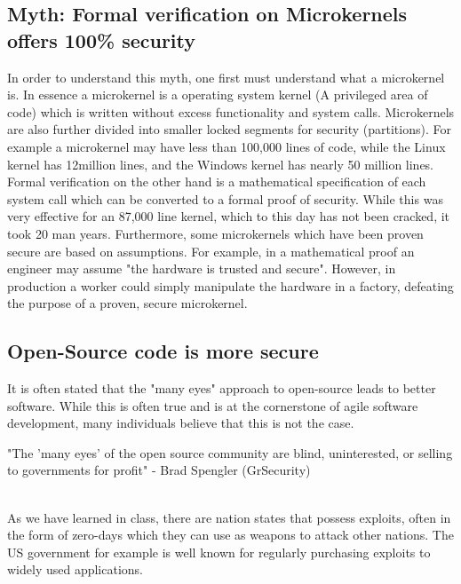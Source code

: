 \documentclass{article}
\newcommand\tab[1][1cm]{\hspace*{#1}}
\begin{document}
\subsection{Myth: Formal verification on Microkernels offers 100\% security}
\tab In order to understand this myth, one first must understand what a microkernel is. In essence a microkernel is a operating system kernel (A privileged area of code)  which is written without excess functionality and system calls. Microkernels are also further divided into smaller locked segments for security (partitions). For example a microkernel may have less than 100,000 lines of code, while the Linux kernel has 12million lines, and the Windows kernel has nearly 50 million lines. Formal verification on the other hand is a mathematical specification of each system call which can be converted to a formal proof of security. While this was very effective for an 87,000 line kernel, which to this day has not been cracked, it took 20 man years. Furthermore, some microkernels which have been proven secure are based on assumptions. For example, in a mathematical proof an engineer may assume "the hardware is trusted and secure". However, in production a worker could simply manipulate the hardware in a factory, defeating the purpose of a proven, secure microkernel.
\\
\subsection{Open-Source code is more secure}
\tab It is often stated that the "many eyes" approach to open-source leads to better software. While this is often true and is at the cornerstone of agile software development, many individuals believe that this is not the case.
\\
\begin{center}
"The 'many eyes' of the open source community are blind, uninterested, or selling to governments for profit" - Brad Spengler (GrSecurity)
\end{center}
\\
\tab As we have learned in class, there are nation states that possess exploits, often in the form of zero-days which they can use as weapons to attack other nations. The US government for example is well known for regularly purchasing exploits to widely used applications.
\\
\end{document}
